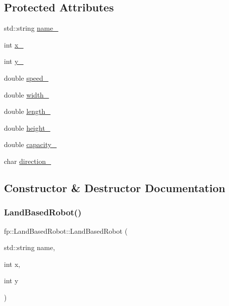 \subsection*{Protected Attributes}
\begin{DoxyCompactItemize}
\item 
std\+::string \hyperlink{classfp_1_1_land_based_robot_ac79ca2c52e99bc96534bb7a57dcb9030}{name\+\_\+}
\item 
int \hyperlink{classfp_1_1_land_based_robot_a55c2b5865fd60fb0158a135031f8b271}{x\+\_\+}
\item 
int \hyperlink{classfp_1_1_land_based_robot_a130cfd6ad383116076dc891ee3a52671}{y\+\_\+}
\item 
double \hyperlink{classfp_1_1_land_based_robot_ae969157e5f910ed0a85198dc7f6c3cef}{speed\+\_\+}
\item 
double \hyperlink{classfp_1_1_land_based_robot_aae605323e9ce63f29dcded204421b1fc}{width\+\_\+}
\item 
double \hyperlink{classfp_1_1_land_based_robot_a9475d5886f329c92e68f0d86b4da58c0}{length\+\_\+}
\item 
double \hyperlink{classfp_1_1_land_based_robot_a34238a27d9055c416a3e6cfedc8ed248}{height\+\_\+}
\item 
double \hyperlink{classfp_1_1_land_based_robot_a542d90c7c62899e3c3cf28791bbb6c8e}{capacity\+\_\+}
\item 
char \hyperlink{classfp_1_1_land_based_robot_adc8e6123fa8ffe86576e46000b0ae779}{direction\+\_\+}
\end{DoxyCompactItemize}


\subsection{Constructor \& Destructor Documentation}
\mbox{\label{classfp_1_1_land_based_robot_a3aabd7151068be36ba93ff5813223e0c}} 
\subsubsection{\texorpdfstring{Land\+Based\+Robot()}{LandBasedRobot()}\hspace{0.1cm}{\footnotesize\ttfamily [1/2]}}
{\footnotesize\ttfamily fp\+::\+Land\+Based\+Robot\+::\+Land\+Based\+Robot (\begin{DoxyParamCaption}\item[{std\+::string}]{name,  }\item[{int}]{x,  }\item[{int}]{y }\end{DoxyParamCaption})}

